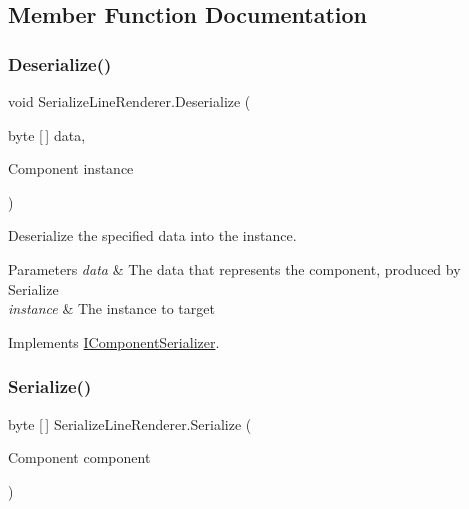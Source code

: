 \subsection{Member Function Documentation}
\mbox{\label{class_serialize_line_renderer_ae925ea66d21c259c560d2cbe5ccb762b}} 
\subsubsection{\texorpdfstring{Deserialize()}{Deserialize()}}
{\footnotesize\ttfamily void Serialize\+Line\+Renderer.\+Deserialize (\begin{DoxyParamCaption}\item[{byte \mbox{[}$\,$\mbox{]}}]{data,  }\item[{Component}]{instance }\end{DoxyParamCaption})\hspace{0.3cm}{\ttfamily [inline]}}



Deserialize the specified data into the instance. 


\begin{DoxyParams}{Parameters}
{\em data} & The data that represents the component, produced by Serialize \\
\hline
{\em instance} & The instance to target \\
\hline
\end{DoxyParams}


Implements \hyperlink{interface_i_component_serializer_a4cc366a5c78b33d47a90c209d8fed883}{I\+Component\+Serializer}.

\mbox{\label{class_serialize_line_renderer_a2e58af3caf73c033912f59f8a568f6e4}} 
\subsubsection{\texorpdfstring{Serialize()}{Serialize()}}
{\footnotesize\ttfamily byte \mbox{[}$\,$\mbox{]} Serialize\+Line\+Renderer.\+Serialize (\begin{DoxyParamCaption}\item[{Component}]{component }\end{DoxyParamCaption})\hspace{0.3cm}{\ttfamily [inline]}}



